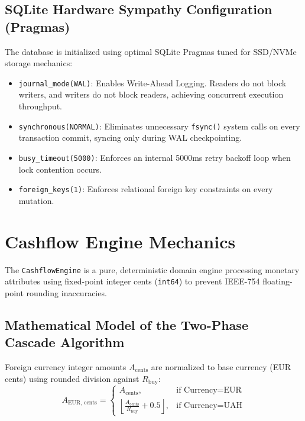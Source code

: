 \documentclass[11pt,a4paper]{article}
\begin{document}
\subsection{SQLite Hardware Sympathy Configuration (Pragmas)}

The database is initialized using optimal SQLite Pragmas tuned for SSD/NVMe storage mechanics:
\begin{itemize}
    \item \texttt{journal\_mode(WAL)}: Enables Write-Ahead Logging. Readers do not block writers, and writers do not block readers, achieving concurrent execution throughput.
    \item \texttt{synchronous(NORMAL)}: Eliminates unnecessary \texttt{fsync()} system calls on every transaction commit, syncing only during WAL checkpointing.
    \item \texttt{busy\_timeout(5000)}: Enforces an internal 5000ms retry backoff loop when lock contention occurs.
    \item \texttt{foreign\_keys(1)}: Enforces relational foreign key constraints on every mutation.
\end{itemize}

\section{Cashflow Engine Mechanics}

The \texttt{CashflowEngine} is a pure, deterministic domain engine processing monetary attributes using fixed-point integer cents (\texttt{int64}) to prevent IEEE-754 floating-point rounding inaccuracies.

\subsection{Mathematical Model of the Two-Phase Cascade Algorithm}

Foreign currency integer amounts $A_{\text{cents}}$ are normalized to base currency (EUR cents) using rounded division against $R_{\text{buy}}$:
\begin{equation}
A_{\text{EUR, cents}} = 
\begin{cases} 
A_{\text{cents}}, & \text{if Currency} = \text{EUR} \\ 
\left\lfloor \frac{A_{\text{cents}}}{R_{\text{buy}}} + 0.5 \right\rfloor, & \text{if Currency} = \text{UAH} 
\end{cases}
\end{equation}
\end{document}
